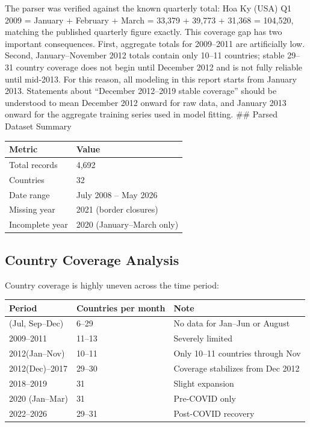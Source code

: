 \documentclass[
]{article}
\begin{document}
The parser was verified against the known quarterly total: Hoa Ky (USA)
Q1 2009 = January + February + March = 33,379 + 39,773 + 31,368 =
104,520, matching the published quarterly figure exactly. This coverage
gap has two important consequences. First, aggregate totals for
2009--2011 are artificially low. Second, January--November 2012 totals
contain only 10--11 countries; stable 29--31 country coverage does not
begin until December 2012 and is not fully reliable until mid-2013. For
this reason, all modeling in this report starts from January 2013.
Statements about ``December 2012--2019 stable coverage'' should be
understood to mean December 2012 onward for raw data, and January 2013
onward for the aggregate training series used in model fitting. \#\#
Parsed Dataset Summary

\begin{longtable}[]{@{}ll@{}}
\toprule\noalign{}
Metric & Value \\
\midrule\noalign{}
\endhead
\bottomrule\noalign{}
\endlastfoot
Total records & 4,692 \\
Countries & 32 \\
Date range & July 2008 -- May 2026 \\
Missing year & 2021 (border closures) \\
Incomplete year & 2020 (January--March only) \\
\end{longtable}

\subsection{Country Coverage Analysis}\label{country-coverage-analysis}

Country coverage is highly uneven across the time period:

\begin{longtable}[]{@{}lll@{}}
\toprule\noalign{}
Period & Countries per month & Note \\
\midrule\noalign{}
\endhead
\bottomrule\noalign{}
\endlastfoot
2008 (Jul, Sep--Dec) & 6--29 & No data for Jan--Jun or August \\
2009--2011 & 11--13 & Severely limited \\
2012(Jan--Nov) & 10--11 & Only 10--11 countries through Nov \\
2012(Dec)--2017 & 29--30 & Coverage stabilizes from Dec 2012 \\
2018--2019 & 31 & Slight expansion \\
2020 (Jan--Mar) & 31 & Pre-COVID only \\
2022--2026 & 29--31 & Post-COVID recovery \\
\end{longtable}
\end{document}
